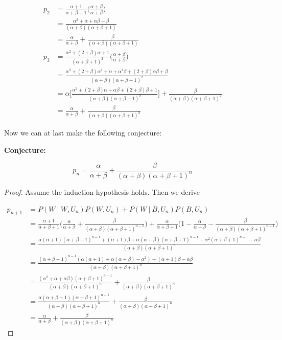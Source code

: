 \documentclass[10pt, oneside]{article}
\begin{document}
\begin{enumerate}[label=3.\arabic*]
\begin{align*}
p_2 &= \frac{\alpha + 1}{\alpha + \beta + 1} \bigg( \frac{\alpha + \beta}{\alpha + \beta} \bigg) \\
&= \frac{\alpha^2 + \alpha + \alpha \beta + \beta}{(\alpha + \beta)(\alpha + \beta + 1)} \\
&= \boxed{ \frac{\alpha}{\alpha + \beta} + \frac{\beta}{(\alpha + \beta)(\alpha + \beta + 1)} } \\
p_3 &= \frac{\alpha^2 + (2 + \beta)\alpha + 1}{(\alpha + \beta + 1)^2} \bigg( \frac{\alpha + \beta}{\alpha + \beta} \bigg) \\
&= \frac{\alpha^3 + (2+\beta)\alpha^2 + \alpha + \alpha^2 \beta + (2+\beta) \alpha \beta + \beta}{(\alpha + \beta)(\alpha + \beta + 1)^2} \\
&= \alpha \bigg[ \frac{\alpha^2 + (2+\beta)\alpha + \alpha \beta + (2+\beta) \beta + 1}{(\alpha + \beta)(\alpha + \beta + 1)^2} \bigg] + \frac{\beta}{(\alpha + \beta)(\alpha + \beta + 1)^2} \\
&= \boxed{ \frac{\alpha}{\alpha + \beta} + \frac{\beta}{(\alpha + \beta)(\alpha + \beta + 1)^2} }
\end{align*}

Now we can at last make the following conjecture:

\textbf{Conjecture:}

\[ p_n = \frac{\alpha}{\alpha + \beta} + \frac{\beta}{(\alpha + \beta)(\alpha + \beta + 1)^n} \]

\begin{proof}
Assume the induction hypothesis holds. Then we derive

\begin{align*}
p_{n+1} &= P(W \ | \ W, U_n) P(W, U_n) + P(W \ | \ B, U_n) P(B, U_n) \\
&= \frac{\alpha + 1}{\alpha + \beta + 1} \bigg( \frac{\alpha}{\alpha + \beta} + \frac{\beta}{(\alpha + \beta) (\alpha + \beta + 1)^{n-1}} \bigg) + \frac{\alpha}{\alpha + \beta + 1} \bigg( 1 - \frac{\alpha}{\alpha + \beta} - \frac{\beta}{(\alpha + \beta)(\alpha + \beta + 1)^{n-1}} \bigg) \\
&= \frac{\alpha (\alpha + 1) (\alpha + \beta + 1)^{n-1} + (\alpha + 1)\beta + \alpha (\alpha + \beta)(\alpha + \beta + 1)^{n-1} - \alpha^2 (\alpha + \beta + 1)^{n-1} - \alpha \beta}{(\alpha + \beta)(\alpha + \beta + 1)^n} \\
&= \frac{(\alpha + \beta + 1)^{n-1} (\alpha (\alpha + 1) + \alpha (\alpha + \beta) - \alpha^2) + (\alpha + 1)\beta - \alpha \beta}{(\alpha + \beta)(\alpha + \beta + 1)^n} \\
&= \frac{(\alpha^2 + \alpha + \alpha \beta)(\alpha + \beta + 1)^{n-1}}{(\alpha + \beta)(\alpha + \beta + 1)^n} + \frac{\beta}{(\alpha + \beta)(\alpha + \beta + 1)^n} \\
&= \frac{\alpha (\alpha + \beta + 1)(\alpha + \beta + 1)^{n-1}}{(\alpha + \beta)(\alpha + \beta + 1)^n} + \frac{\beta}{(\alpha + \beta)(\alpha + \beta + 1)^n} \\
&= \boxed{ \frac{\alpha}{\alpha + \beta} + \frac{\beta}{(\alpha + \beta)(\alpha + \beta + 1)^n} }
\end{align*}


\end{proof}
\end{enumerate}
\end{document}
